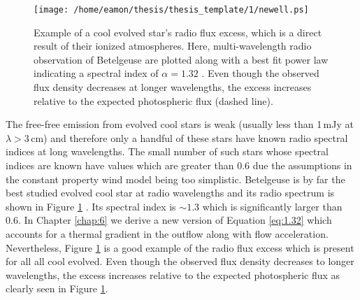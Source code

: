 \begin{figure}[hbt!]
\centering 
          \texttt{[image: /home/eamon/thesis/thesis\_template/1/newell.ps]}
\caption[Radio spectral index for Betelgeuse]{Example of a cool evolved star's radio flux excess, which is a direct result of their ionized atmospheres. Here, multi-wavelength radio observation of Betelgeuse are plotted along with a best fit power law indicating a spectral index of $\alpha = 1.32$ \citep{newell_1982}.  Even though the observed flux density decreases at longer wavelengths, the excess increases relative to the expected photospheric flux (dashed line).}
\label{fig:1.5.5}
\end{figure}

The free-free emission from evolved cool stars is weak (usually less than 1\,mJy at $\lambda > 3$\,cm) and therefore only a handful of these stars have known radio spectral indices at long wavelengths. The small number of such stars whose spectral indices are known have values which are greater than 0.6 \citep[e.g.][]{drake_1986} due the assumptions in the constant property wind model being too simplistic. Betelgeuse is by far the best studied evolved cool star at radio wavelengths and its radio spectrum is shown in Figure \ref{fig:1.5.5} \citep{newell_1982}. Its spectral index is $\sim 1.3$ which is significantly larger than 0.6. In Chapter \ref{chap:6} we derive a new version of Equation \ref{eq:1.32} which accounts for a thermal gradient in the outflow along with flow acceleration. Nevertheless, Figure \ref{fig:1.5.5} is a good example of the radio flux excess which is present for all all cool evolved. Even though the observed flux density decreases to longer wavelengths, the excess increases relative to the expected photospheric flux as clearly seen in Figure \ref{fig:1.5.5}.

